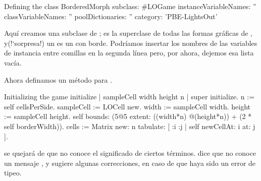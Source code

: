 \documentclass[a4paper,10pt,twoside]{book}
\begin{document}
\begin{classdef}[sbegame]{Defining the  class}
BorderedMorph subclass: #LOGame
   instanceVariableNames: ''
   classVariableNames: ''
   poolDictionaries: ''
   category: 'PBE-LightsOut'
\end{classdef}

Aqu\'i creamos una subclase de ;  es la superclase de todas las formas gr\'aficas de \pharo, y(!`sorpresa!) un  es un  con borde.
Podr\'iamos insertar los nombres de las variables de instancia entre comillas en la segunda l\'inea pero, por ahora, dejemos esa lista vac\'ia.

Ahora definamos un m\'etodo  para .


\begin{numMethod}[sbegameinitialize]{Initializing the game}
initialize
   | sampleCell width height n |
   super initialize.
   n := self cellsPerSide.
   sampleCell := LOCell new.
   width := sampleCell width.
   height := sampleCell height.
   self bounds: (5@5 extent: ((width*n) @(height*n)) + (2 * self borderWidth)).
   cells := Matrix new: n tabulate: [ :i :j | self newCellAt: i at: j ].
\end{numMethod}

\pharo se quejar\'a de que no conoce el significado de ciertos t\'erminos.
\pharo dice que no conoce un mensaje , y sugiere algunas correcciones, en caso de que haya sido un error de tipeo.
\end{document}
